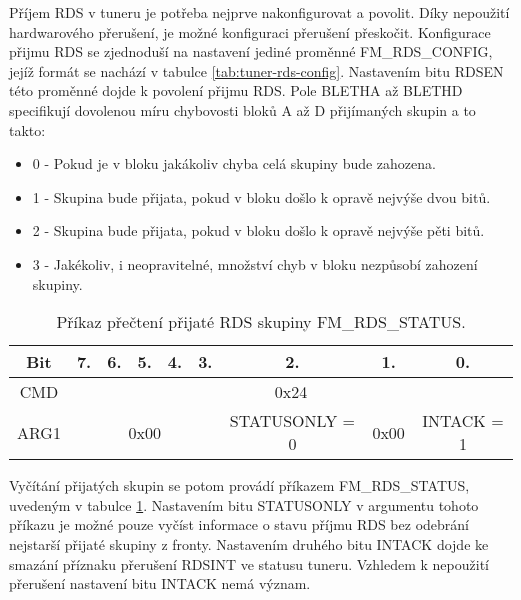 Příjem RDS v tuneru je potřeba nejprve nakonfigurovat a povolit. Díky nepoužití hardwarového přerušení, je možné konfiguraci přerušení přeskočit. Konfigurace přijmu RDS se zjednoduší na nastavení jediné proměnné FM\_RDS\_CONFIG, jejíž formát se nachází v tabulce \ref{tab:tuner-rds-config}. Nastavením bitu RDSEN této proměnné dojde k povolení přijmu RDS. Pole BLETHA až BLETHD specifikují dovolenou míru chybovosti bloků A až D přijímaných skupin a to takto:

\begin{itemize}
\item 0 - Pokud je v bloku jakákoliv chyba celá skupiny bude zahozena.
\item 1 - Skupina bude přijata, pokud v bloku došlo k opravě nejvýše dvou bitů. 
\item 2 - Skupina bude přijata, pokud v bloku došlo k opravě nejvýše pěti bitů.
\item 3 - Jakékoliv, i neopravitelné, množství chyb v bloku nezpůsobí zahození skupiny.
\end{itemize}

\begin{table}[ht!]
\begin{center}
\begin{tabular}{|c|c|c|c|c|c|c|c|c|}
\hline 
Bit & 7. & 6. & 5. & 4. & 3. & 2. & 1. & 0. \\ 
\hline 
CMD & \multicolumn{8}{c|}{0x24} \\ 
\hline 
ARG1 & \multicolumn{5}{c|}{0x00} & STATUSONLY = 0 & 0x00 & INTACK = 1 \\ 
\hline 
\end{tabular} 
\end{center}
\caption{Příkaz přečtení přijaté RDS skupiny FM\_RDS\_STATUS.}
\label{tab:tuner-rds-get} 
\end{table}

Vyčítání přijatých skupin se potom provádí příkazem FM\_RDS\_STATUS, uvedeným v tabulce \ref{tab:tuner-rds-get}. Nastavením bitu STATUSONLY v argumentu tohoto příkazu je možné pouze vyčíst informace o stavu příjmu RDS bez odebrání nejstarší přijaté skupiny z fronty. Nastavením druhého bitu INTACK dojde ke smazání příznaku přerušení RDSINT ve statusu tuneru. Vzhledem k nepoužití přerušení nastavení bitu INTACK nemá význam.

